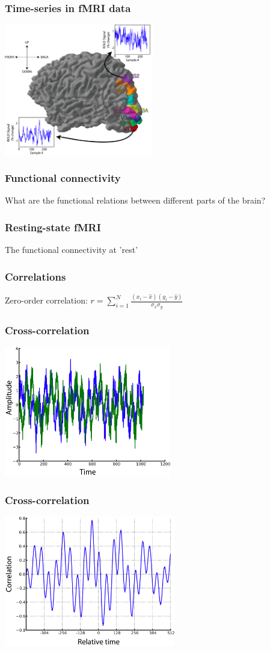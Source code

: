 \documentclass{beamer}
\begin{document}
\begin{frame}
\frametitle{Time-series in fMRI data}
\includegraphics[height=5.7cm]{figures/brain_w_tseries}
\end{frame}

\begin{frame}
\frametitle{Functional connectivity}
What are the functional relations between different parts of the brain?
\end{frame}

\begin{frame}
\frametitle{Resting-state fMRI}
The functional connectivity at 'rest'
\end{frame}

\begin{frame}
\frametitle{Correlations}
\pause
Zero-order correlation:
\pause
$r = \sum_{i=1}^{N}{\frac{(x_i-\hat{x})(y_i-\hat{y})}{\sigma_x \sigma_y}}$
\end{frame}

\begin{frame}
\frametitle{Cross-correlation}
\includegraphics[height=5.7cm]{figures/outa_phase_tseries}
\end{frame}

\begin{frame}
\frametitle{Cross-correlation}
\includegraphics[height=5.7cm]{figures/outa_phase_xcorr}
\end{frame}
\end{document}
